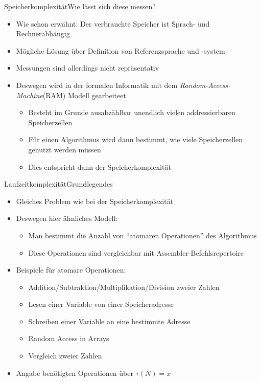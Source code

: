 
\begin{frame}{Speicherkomplexität}{Wie lässt sich diese messen?}
    \begin{itemize}[<+->]
        \item Wie schon erwähnt: Der verbrauchte Speicher ist Sprach- und Rechnerabhängig
        \item Mögliche Lösung über Definition von Referenzsprache und -system
        \item Messungen sind allerdings nicht repräsentativ
        \item Deswegen wird in der formalen Informatik mit dem \textit{Random-Access-Machine}(RAM) Modell gearbeiteet
        \begin{itemize}
            \item Besteht im Grunde ausabzählbar unendlich vielen addressierbaren Speicherzellen
            \item Für einen Algorithmus wird dann bestimmt, wie viele Speicherzellen genutzt werden müssen
            \item Dies entspricht dann der Speicherkomplexität
        \end{itemize}
    \end{itemize}
\end{frame}

\begin{frame}{Laufzeitkomplexität}{Grundlegendes}
    \begin{itemize}[<+->]
        \item Gleiches Problem wie bei der Speicherkomplexität
        \item Deswegen hier ähnliches Modell:
        \begin{itemize}
            \item Man bestimmt die Anzahl von "`atomaren Operationen"' des Algorithmus
            \item Diese Operationen sind vergleichbar mit Assembler-Befehlsrepertoire
        \end{itemize}
        \item Beispiele für atomare Operationen:
        \begin{itemize}
            \item Addition/Subtraktion/Multiplikation/Division zweier Zahlen
            \item Lesen einer Variable von einer Speicheradresse
            \item Schreiben einer Variable an eine bestimmte Adresse
            \item Random Access in Arrays
            \item Vergleich zweier Zahlen
        \end{itemize}
        \item Angabe benötigten Operationen über $\tau(N)=x$
    \end{itemize}
\end{frame}

